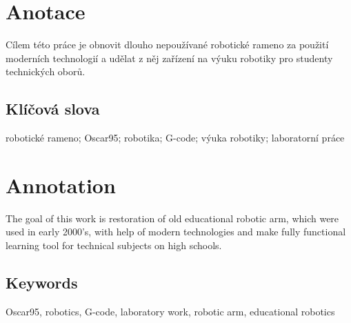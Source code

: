 \documentclass{template/socthesis}
\author{Denis Kučera}
\begin{document}
	
	\maketitle
	
	
	
	\pagestyle{empty}
	
	\section*{Anotace}
	Cílem této práce je obnovit dlouho nepoužívané robotické rameno za použití moderních technologií a udělat z něj zařízení na výuku robotiky pro studenty technických oborů.
	
	\subsection*{Klíčová slova}
	robotické rameno; Oscar95; robotika; G-code; výuka robotiky; laboratorní práce
	
	\vspace{10mm}
	
	\section*{Annotation}
	The goal of this work is restoration of old educational robotic arm, which were used in early 2000's, with help of modern technologies and make fully functional learning tool for technical subjects on high schools.
	
	\subsection*{Keywords}
	Oscar95, robotics, G-code, laboratory work, robotic arm, educational robotics
	
	\newpage
	\pagestyle{plain}
	
    \tableofcontents %
	
	\setcounter{figure}{0}
	\setcounter{table}{0}
	\newpage
	
	
	
	
	
	
	
\end{document}
